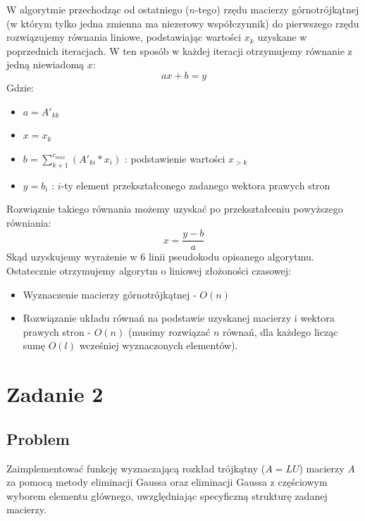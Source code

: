 \documentclass[11pt]{article}
\begin{document}
        \noindent
        W algorytmie przechodząc od ostatniego ($n$-tego) rzędu macierzy górnotrójkątnej (w którym tylko jedna zmienna ma niezerowy współczynnik) do pierwszego rzędu rozwiązujemy równania liniowe, podstawiając wartości $x_k$ uzyskane w poprzednich iteracjach. W ten sposób w każdej iteracji otrzymujemy równanie z jedną niewiadomą $x$:
        $$ ax + b = y $$
        \noindent
        Gdzie:
        \begin{itemize}
            \item $a = A'_{kk}$
            \item $x = x_k$
            \item $b = \sum_{k + 1}^{c_{max}}(A'_{ki} * x_i)$ : podstawienie wartości $x_{>k}$
            \item $y = b_i$ : $i$-ty element przekształconego zadanego wektora prawych stron
        \end{itemize}
        \noindent
        Rozwiąznie takiego równania możemy uzyskać po przekształceniu powyższego równiania:
        $$ x = \frac{y - b}{a} $$
        Skąd uzyskujemy wyrażenie w $6$ linii pseudokodu opisanego algorytmu.
        \newline\newline
        Ostatecznie otrzymujemy algorytm o liniowej złożoności czasowej:
        \begin{itemize}
            \item Wyznaczenie macierzy górnotrójkątnej - $O(n)$
            \item Rozwiązanie układu równań na podstawie uzyskanej macierzy i wektora prawych stron - $O(n)$ (musimy rozwiązać $n$ równań, dla każdego licząc sumę $O(l)$ wcześniej wyznaczonych elementów).
        \end{itemize}

\newpage

\section*{Zadanie 2}
    \subsection*{Problem}
        Zaimplementować funkcję wyznaczającą rozkład trójkątny ($A = LU$) macierzy $A$ za pomocą metody eliminacji Gaussa oraz eliminacji Gaussa z częściowym wyborem elementu głównego, uwzględniając specyficzną strukturę zadanej macierzy.
\end{document}
